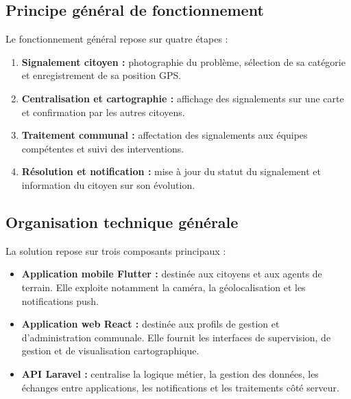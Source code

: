 \documentclass[11pt,a4paper,oneside]{report}
\begin{document}
	\subsection{Principe général de fonctionnement}
	
	Le fonctionnement général repose sur quatre étapes :
	
	\begin{enumerate}
		\item \textbf{Signalement citoyen :}
		photographie du problème, sélection de sa catégorie
		et enregistrement de sa position GPS.
		
		\item \textbf{Centralisation et cartographie :}
		affichage des signalements sur une carte et
		confirmation par les autres citoyens.
		
		\item \textbf{Traitement communal :}
		affectation des signalements aux équipes
		compétentes et suivi des interventions.
		
		\item \textbf{Résolution et notification :}
		mise à jour du statut du signalement et
		information du citoyen sur son évolution.
	\end{enumerate}
	
	\subsection{Organisation technique générale}
	
	La solution repose sur trois composants principaux :
	
	\begin{itemize}
		\item \textbf{Application mobile Flutter :}
		destinée aux citoyens et aux agents de terrain.
		Elle exploite notamment la caméra, la
		géolocalisation et les notifications push.
		
		\item \textbf{Application web React :}
		destinée aux profils de gestion et
		d'administration communale. Elle fournit les
		interfaces de supervision, de gestion et de
		visualisation cartographique.
		
		\item \textbf{API Laravel :}
		centralise la logique métier, la gestion des
		données, les échanges entre applications,
		les notifications et les traitements côté serveur.
	\end{itemize}
	
\end{document}
